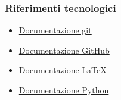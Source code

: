 \documentclass[10pt]{article}
\begin{document}
        \subsubsection{Riferimenti tecnologici}
        \begin{itemize}
            \item \href{https://git-scm.com/docs}{Documentazione git}
            \item \href{https://docs.github.com/en}{Documentazione GitHub}
            \item \href{https://www.latex-project.org/help/documentation/}{Documentazione LaTeX}
            \item \href{https://www.python.org/doc/}{Documentazione Python}
        \end{itemize}
\end{document}
